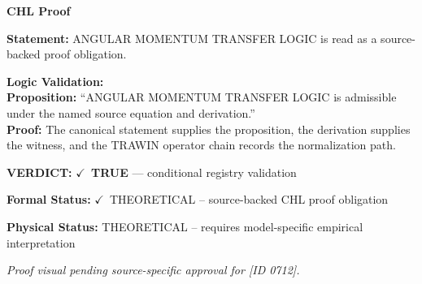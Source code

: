 \vspace{0.45em}
\noindent\textbf{CHL Proof}\par
\textbf{Statement:} ANGULAR MOMENTUM TRANSFER LOGIC is read as a source-backed proof obligation.

\textbf{Logic Validation:}\\
\textbf{Proposition:} ``ANGULAR MOMENTUM TRANSFER LOGIC is admissible under the named source equation and derivation.''\\
\textbf{Proof:} The canonical statement supplies the proposition, the derivation supplies the witness, and the TRAWIN operator chain records the normalization path.

\textbf{VERDICT:} \ensuremath{\checkmark}\ \textbf{TRUE} --- conditional registry validation

\textbf{Formal Status:} \ensuremath{\checkmark}\ THEORETICAL -- source-backed CHL proof obligation

\textbf{Physical Status:} THEORETICAL -- requires model-specific empirical interpretation
\par\vspace{0.45em}
\par
\vfill
\begingroup\footnotesize\itshape
Proof visual pending source-specific approval for [ID 0712].
\par\endgroup
\vfill
\endgroup
\endgroup
